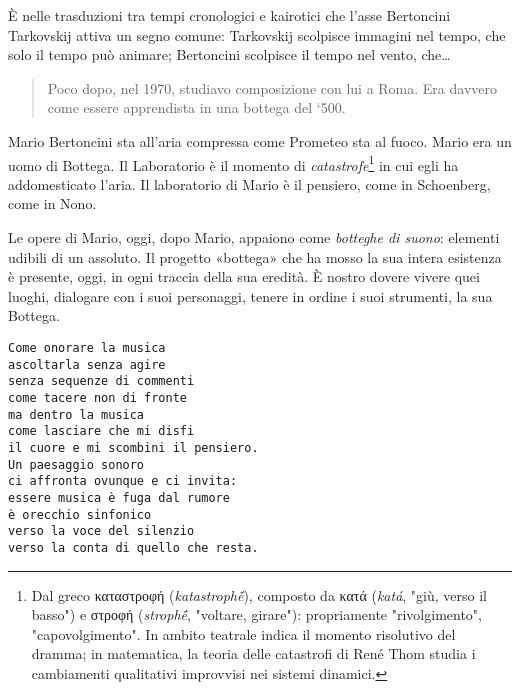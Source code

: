 È nelle trasduzioni tra tempi cronologici e kairotici che l'asse Bertoncini
Tarkovskij attiva un segno comune: Tarkovskij scolpisce immagini nel tempo, che
solo il tempo può animare; Bertoncini scolpisce il tempo nel vento, che\ldots

\begin{quote}
Poco dopo, nel 1970, studiavo composizione con lui a Roma. Era davvero come
essere apprendista in una bottega del ‘500. \cite{nottoli2019}
\end{quote}

Mario Bertoncini sta all'aria compressa come Prometeo sta al fuoco. Mario era un
uomo di Bottega. Il Laboratorio è il momento di \emph{catastrofe}\footnote{%
  Dal greco \textgreek{καταστροφή} (\emph{katastrophḗ}), composto da
  \textgreek{κατά} (\emph{katá}, "giù, verso il basso") e \textgreek{στροφή}
  (\emph{strophḗ}, "voltare, girare"): propriamente "rivolgimento",
  "capovolgimento". In ambito teatrale indica il momento risolutivo del dramma;
  in matematica, la teoria delle catastrofi di René Thom \cite{thom1972} studia
  i cambiamenti qualitativi improvvisi nei sistemi dinamici.
} in cui egli ha
addomesticato l'aria. Il laboratorio di Mario è il pensiero, come in Schoenberg,
come in Nono.

Le opere di Mario, oggi, dopo Mario, appaiono come \emph{botteghe di suono}:
elementi udibili di un assoluto. Il progetto «bottega» che ha mosso la sua
intera esistenza è presente, oggi, in ogni traccia della sua eredità. È nostro
dovere vivere quei luoghi, dialogare con i suoi personaggi, tenere in ordine i
suoi strumenti, la sua Bottega.

\null\vfill
\begin{verbatim}
Come onorare la musica
ascoltarla senza agire
senza sequenze di commenti
come tacere non di fronte
ma dentro la musica
come lasciare che mi disfi
il cuore e mi scombini il pensiero.
Un paesaggio sonoro
ci affronta ovunque e ci invita:
essere musica è fuga dal rumore
è orecchio sinfonico
verso la voce del silenzio
verso la conta di quello che resta.
\end{verbatim}
